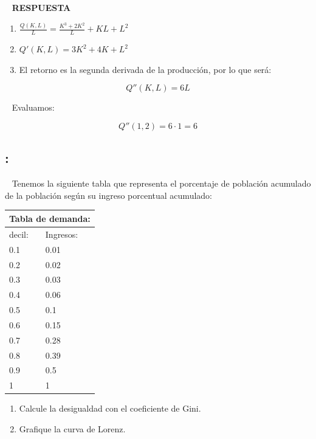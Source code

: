 \documentclass[
  letterpaper,
  DIV=11,
  numbers=noendperiod]{scrreport}
\begin{document}
~ \textbf{RESPUESTA}

\hfill\break

\begin{enumerate}
\def\labelenumi{\alph{enumi})}
\item
  \(\frac{Q(K,L)}{L}=\frac{K^3+2K^2}{L}+KL+L^2\)
\item
  \(Q'(K,L)=3K^2+4K+L^2\)
\item
  El retorno es la segunda derivada de la producción, por lo que será:
\end{enumerate}

\[
Q''(K,L) = 6L
\]

~ Evaluamos:

\[
Q''(1,2)=6\cdot 1=6
\]

\hypertarget{section-39}{%
\subsection{:}\label{section-39}}

~ Tenemos la siguiente tabla que representa el porcentaje de población
acumulado de la población según su ingreso porcentual acumulado:

\begin{table}[H]
    \centering
    \begin{tabular}{|p{25mm}|p{25mm}|}
        \multicolumn{2}{c}{Tabla de demanda:} \\
        \hline
        decil: & Ingresos: \\ \hline
        0.1 & 0.01 \\ \hline
        0.2 & 0.02 \\ \hline
        0.3 & 0.03 \\ \hline
        0.4 & 0.06 \\ \hline
        0.5 & 0.1 \\ \hline
        0.6 & 0.15 \\ \hline
        0.7 & 0.28 \\ \hline
        0.8 & 0.39 \\ \hline
        0.9 & 0.5 \\ \hline
        1 & 1 \\ \hline
        \end{tabular}
\end{table}

\begin{enumerate}
\def\labelenumi{\arabic{enumi})}
\item
  Calcule la desigualdad con el coeficiente de Gini.
\item
  Grafique la curva de Lorenz.
\end{enumerate}
\end{document}

